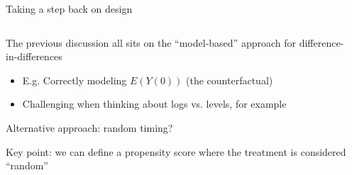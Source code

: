 \documentclass[notes,11pt, aspectratio=169]{beamer}
\newenvironment{wideitemize}{\itemize\addtolength{\itemsep}{10pt}}{\enditemize}
\begin{document}
\begin{frame}{Taking a step back on design}
  \begin{columns}[T] %
    \begin{column}{0.4\textwidth}
      \begin{wideitemize}
      \item The previous discussion all sits on the ``model-based'' approach for difference-in-differences
        \begin{itemize}
        \item E.g. Correctly modeling $E(Y(0))$ (the counterfactual)
        \item Challenging when thinking about logs vs. levels, for example
        \end{itemize}
      \item Alternative approach: random timing?
      \item<2-> Key point: we can define a propensity score where the treatment is considered ``random''
      \end{wideitemize}
    \end{column}%
    \hfill%
    \begin{column}{.5\textwidth}

\end{column}
\end{columns}
\end{frame}
\end{document}
